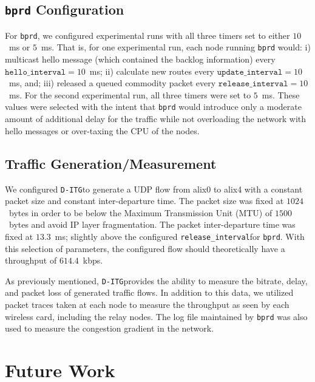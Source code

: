 \documentclass{article}
\newcommand{\bprd}{\texttt{bprd}\xspace}
\newcommand{\ditg}{\texttt{D-ITG}}
\newcommand{\hellointerval}{\texttt{hello\_interval}}
\newcommand{\releaseinterval}{\texttt{release\_interval}}
\newcommand{\updateinterval}{\texttt{update\_interval}}
\begin{document}
\subsection{\bprd Configuration}

For \bprd, we configured experimental runs with all three timers set to either \(10\)~ms or \(5\)~ms.
That is, for one experimental run, each node running \bprd would: 
i) multicast hello message (which contained the backlog information) every \(\hellointerval=10\)~ms; 
ii) calculate new routes every \(\updateinterval=10\)~ms, and; 
iii) released a queued commodity packet every \(\releaseinterval=10\)~ms.
For the second experimental run, all three timers were set to \(5\)~ms.
These values were selected with the intent that \bprd would introduce only a moderate amount of additional delay for the traffic while not overloading the network with hello messages or over-taxing the CPU of the nodes.



\subsection{Traffic Generation/Measurement}

We configured \ditg to generate a UDP flow from alix0 to alix4 with a constant packet size and constant inter-departure time.
The packet size was fixed at \(1024\)~bytes in order to be below the Maximum Transmission Unit (MTU) of \(1500\)~bytes and avoid IP layer fragmentation.
The packet inter-departure time was fixed at \(13.3\)~ms; slightly above the configured \releaseinterval for \bprd.
With this selection of parameters, the configured flow should theoretically have a throughput of \(614.4\)~kbps.


As previously mentioned, \ditg provides the ability to measure the bitrate, delay, and packet loss of generated traffic flows.
In addition to this data, we utilized packet traces taken at each node to measure the throughput as seen by each wireless card, including the relay nodes.
The log file maintained by \bprd was also used to measure the congestion gradient in the network.


\section{Future Work}\label{sec:future}
\end{document}
